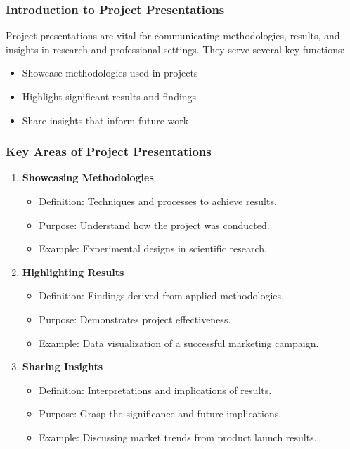 \documentclass[aspectratio=169]{beamer}
\begin{document}
\frame{\titlepage}

\begin{frame}[fragile]
    \frametitle{Introduction to Project Presentations}
    Project presentations are vital for communicating methodologies, results, and insights in research and professional settings. They serve several key functions:
    \begin{itemize}
        \item Showcase methodologies used in projects
        \item Highlight significant results and findings
        \item Share insights that inform future work
    \end{itemize}
\end{frame}

\begin{frame}[fragile]
    \frametitle{Key Areas of Project Presentations}
    \begin{enumerate}
        \item \textbf{Showcasing Methodologies}
        \begin{itemize}
            \item Definition: Techniques and processes to achieve results.
            \item Purpose: Understand how the project was conducted.
            \item Example: Experimental designs in scientific research.
        \end{itemize}

        \item \textbf{Highlighting Results}
        \begin{itemize}
            \item Definition: Findings derived from applied methodologies.
            \item Purpose: Demonstrates project effectiveness.
            \item Example: Data visualization of a successful marketing campaign.
        \end{itemize}

        \item \textbf{Sharing Insights}
        \begin{itemize}
            \item Definition: Interpretations and implications of results.
            \item Purpose: Grasp the significance and future implications.
            \item Example: Discussing market trends from product launch results.
        \end{itemize}
    \end{enumerate}
\end{frame}
\end{document}
